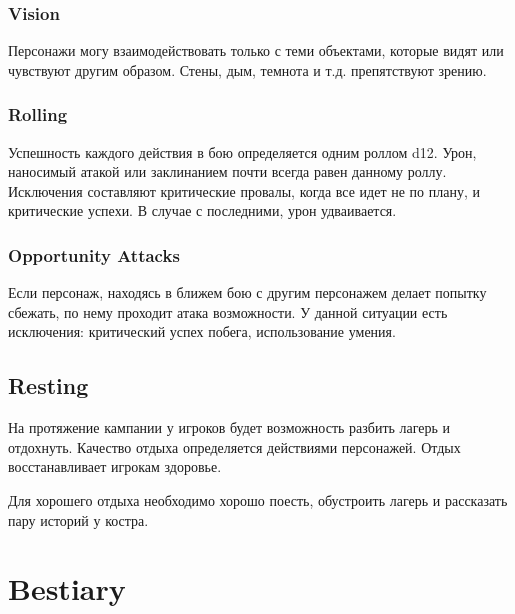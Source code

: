 \documentclass[a4paper,12pt,twocolumn]{book}
\begin{document}
\subsection{Vision}

Персонажи могу взаимодействовать только с теми объектами, которые видят или чувствуют другим образом. Стены, дым, темнота и т.д. препятствуют зрению.

\subsection{Rolling}

Успешность каждого действия в бою определяется одним роллом d12. Урон, наносимый атакой или заклинанием почти всегда равен данному роллу. Исключения составляют критические провалы, когда все идет не по плану, и критические успехи. В случае с последними, урон удваивается.

\subsection{Opportunity Attacks}

Если персонаж, находясь в ближем бою с другим персонажем делает попытку сбежать, по нему проходит атака возможности. У данной ситуации есть исключения: критический успех побега, использование умения.


\section{Resting}

На протяжение кампании у игроков будет возможность разбить лагерь и отдохнуть. Качество отдыха определяется действиями персонажей. Отдых восстанавливает игрокам здоровье.

Для хорошего отдыха необходимо хорошо поесть, обустроить лагерь и рассказать пару историй у костра.

\chapter{Bestiary}
\end{document}
